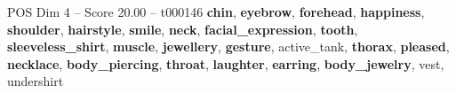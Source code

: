 \begin{textsample}{POS Dim 4 – Score 20.00 – t000146}  \label{ex:f4_pos_019}
\textbf{chin}, \textbf{eyebrow}, \textbf{forehead}, \textbf{happiness}, \textbf{shoulder}, \textbf{hairstyle}, \textbf{smile}, \textbf{neck}, \textbf{facial\_expression}, \textbf{tooth}, \textbf{sleeveless\_shirt}, \textbf{muscle}, \textbf{jewellery}, \textbf{gesture}, active\_tank, \textbf{thorax}, \textbf{pleased}, \textbf{necklace}, \textbf{body\_piercing}, \textbf{throat}, \textbf{laughter}, \textbf{earring}, \textbf{body\_jewelry}, vest, undershirt

\end{textsample}
